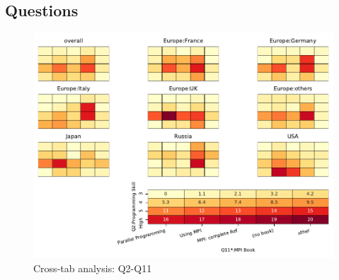 
\subsection{Questions}


\begin{figure}
\begin{center}
\includegraphics[width=12cm]{../pdfs/Q2-Q11.pdf}
\caption{Cross-tab analysis: Q2-Q11}
\label{fig:Q2-Q11}
\end{center}
\end{figure}
